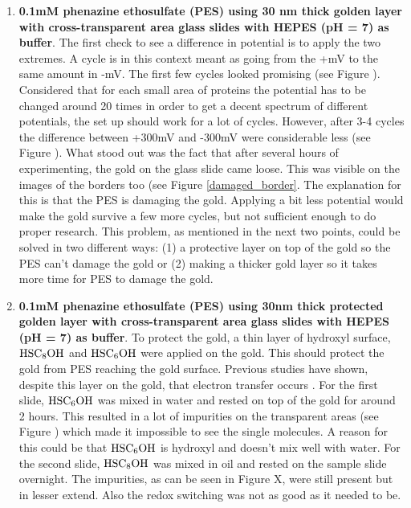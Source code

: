 \begin{enumerate}
\item \textbf{0.1mM phenazine ethosulfate (PES) using 30 nm thick golden layer with cross-transparent area glass slides with HEPES (pH = 7) as buffer}. The first check to see a difference in potential is to apply the two extremes. A cycle is in this context meant as going from the +mV to the same amount in -mV. The first few cycles looked promising (see Figure ). Considered that for each small area of proteins the potential has to be changed around 20 times in order to get a decent spectrum of different potentials, the set up should work for a lot of cycles. However, after 3-4 cycles the difference between +300mV and -300mV were considerable less (see Figure ). What stood out was the fact that after several hours of experimenting, the gold on the glass slide came loose. This was visible on the images of the borders too (see Figure \ref{damaged_border}. The explanation for this is that the PES is damaging the gold. Applying a bit less potential would make the gold survive a few more cycles, but not sufficient enough to do proper research. This problem, as mentioned in the next two points, could be solved in two different ways: (1) a protective layer on top of the gold so the PES can't damage the gold or (2) making a thicker gold layer so it takes more time for PES to damage the gold.

\item \textbf{0.1mM phenazine ethosulfate (PES) using 30nm thick protected golden layer with cross-transparent area glass slides with HEPES (pH = 7) as buffer}. To protect the gold, a thin layer of hydroxyl surface, $\textup{HSC}_{8}\textup{OH}$ and $\textup{HSC}_{6}\textup{OH}$ were applied on the gold. This should protect the gold from PES reaching the gold surface. Previous studies have shown, despite this layer on the gold, that electron transfer occurs \cite{Ciobanu2006}. For the first slide,  $\textup{HSC}_{6}\textup{OH}$ was mixed in water and rested on top of the gold for around 2 hours. This resulted in a lot of impurities on the transparent areas (see Figure ) which made it impossible to see the single molecules. A reason for this could be that $\textup{HSC}_{6}\textup{OH}$ is hydroxyl and doesn't mix well with water. For the second slide, $\textup{HSC}_{8}\textup{OH}$ was mixed in oil and rested on the sample slide overnight. The impurities, as can be seen in Figure X, were still present but in lesser extend. Also the redox switching was not as good as it needed to be. 


\end{enumerate}
